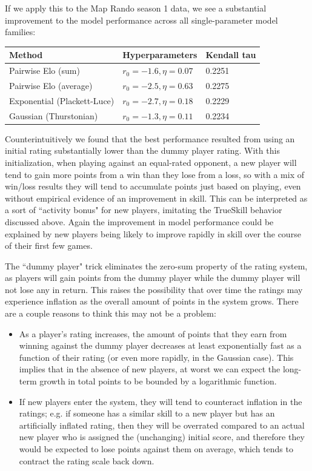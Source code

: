\documentclass{article}
\begin{document}
	If we apply this to the Map Rando season 1 data, we see a substantial improvement to the model performance across all single-parameter model families:
	
	\begin{center}
	\begin{tabular}{l|l|l}
		Method & Hyperparameters & Kendall tau \\ \hline
		Pairwise Elo (sum) &  $r_0 = -1.6, \eta=0.07$ & 0.2251 \\
		Pairwise Elo (average) & $r_0 = -2.5, \eta=0.63$ & 0.2275 \\
		Exponential (Plackett-Luce) & $r_0 = -2.7, \eta=0.18$ & 0.2229 \\
		Gaussian (Thurstonian) & $r_0 = -1.3, \eta=0.11$ & 0.2234 \\
	\end{tabular}
	\end{center}
	
	Counterintuitively we found that the best performance resulted from using an initial rating substantially lower than the dummy player rating. With this initialization, when playing against an equal-rated opponent, a new player will tend to gain more points from a win than they lose from a loss, so with a mix of win/loss results they will tend to accumulate points just based on playing, even without empirical evidence of an improvement in skill. This can be interpreted as a sort of ``activity bonus" for new players, imitating the TrueSkill behavior discussed above. Again the improvement in model performance could be explained by new players being likely to improve rapidly in skill over the course of their first few games. 
	
	The ``dummy player" trick eliminates the zero-sum property of the rating system, as players will gain points from the dummy player while the dummy player will not lose any in return. This raises the possibility that over time the ratings may experience inflation as the overall amount of points in the system grows. There are a couple reasons to think this may not be a problem:
	\begin{itemize}
		\item  As a player's rating increases, the amount of points that they earn from winning against the dummy player decreases at least exponentially fast as a function of their rating (or even more rapidly, in the Gaussian case). This implies that in the absence of new players, at worst we can expect the long-term growth in total points to be bounded by a logarithmic function.
		\item  If new players enter the system, they will tend to counteract inflation in the ratings; e.g. if someone has a similar skill to a new player but has an artificially inflated rating, then they will be overrated compared to an actual new player who is assigned the (unchanging) initial score, and therefore they would be expected to lose points against them on average, which tends to contract the rating scale back down.

	\end{itemize}
\end{document}

